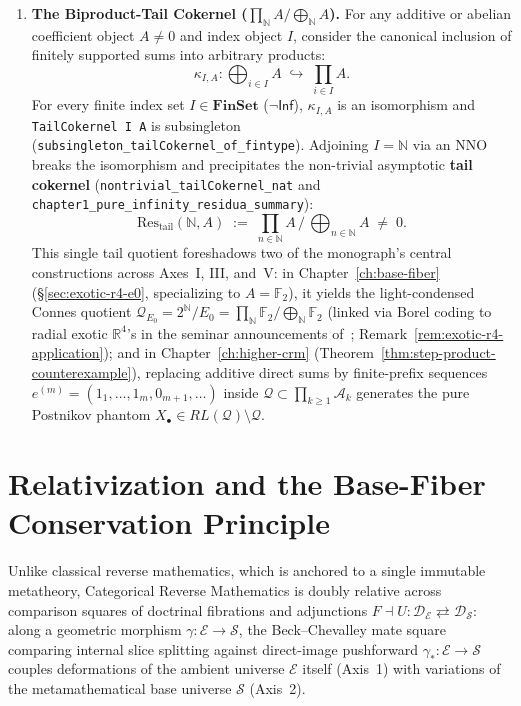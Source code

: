 \documentclass[10pt,twoside,openright]{book}
\theoremstyle{crmplain}
\theoremstyle{crmdef}
\theoremstyle{crmremark}
\begin{document}
\begin{enumerate}[label=\textbf{\arabic*.},leftmargin=1.8em]
  \item \textbf{The Biproduct-Tail Cokernel ($\prod_{\mathbb{N}} A / \bigoplus_{\mathbb{N}} A$).} For any additive or abelian coefficient object $A \neq 0$ and index object $I$, consider the canonical inclusion of finitely supported sums into arbitrary products:
  \[
    \kappa_{I, A} : \bigoplus_{i \in I} A \;\hookrightarrow\; \prod_{i \in I} A.
  \]
  For every finite index set $I \in \mathbf{FinSet}$ ($\neg\mathsf{Inf}$), $\kappa_{I, A}$ is an isomorphism and \texttt{TailCokernel I A} is subsingleton (\texttt{subsingleton\_\allowbreak tailCokernel\_\allowbreak of\_\allowbreak fintype}). Adjoining $I = \mathbb{N}$ via an $\mathrm{NNO}$ breaks the isomorphism and precipitates the non-trivial asymptotic \textbf{tail cokernel} (\texttt{nontrivial\_\allowbreak tailCokernel\_\allowbreak nat} and \texttt{chapter1\_\allowbreak pure\_\allowbreak infinity\_\allowbreak residua\_\allowbreak summary}):
  \[
    \mathrm{Res}_{\mathrm{tail}}(\mathbb{N}, A) \;:=\; \prod_{n \in \mathbb{N}} A \,\Big/\, \bigoplus_{n \in \mathbb{N}} A \;\neq\; 0.
  \]
  This single tail quotient foreshadows two of the monograph's central constructions across Axes~I, III, and~V: in Chapter~\ref{ch:base-fiber} (\S\ref{sec:exotic-r4-e0}, specializing to $A = \mathbb{F}_2$), it yields the light-condensed Connes quotient $\mathcal{Q}_{E_0} = 2^{\mathbb{N}}/E_0 = \prod_{\mathbb{N}} \mathbb{F}_2 / \bigoplus_{\mathbb{N}} \mathbb{F}_2$ (linked via Borel coding to radial exotic $\mathbb{R}^4$'s in the seminar announcements of~\cite{GompfPanagiotopoulos26}; Remark~\ref{rem:exotic-r4-application}); and in Chapter~\ref{ch:higher-crm} (Theorem~\ref{thm:step-product-counterexample}), replacing additive direct sums by finite-prefix sequences $e^{(m)} = (1_1, \dots, 1_m, 0_{m+1}, \dots)$ inside $\mathcal{Q} \subset \prod_{k \ge 1} \mathcal{A}_k$ generates the pure Postnikov phantom $X_\bullet \in RL(\mathcal{Q}) \setminus \mathcal{Q}$.

\end{enumerate}

\section{Relativization and the Base-Fiber Conservation Principle}\label{sec:base-fiber}

Unlike classical reverse mathematics, which is anchored to a single immutable metatheory, Categorical Reverse Mathematics is doubly relative across comparison squares of doctrinal fibrations and adjunctions $F \dashv U : \mathcal{D}_{\mathcal{E}} \rightleftarrows \mathcal{D}_{\mathcal{S}}$: along a geometric morphism $\gamma : \mathcal{E} \to \mathcal{S}$, the Beck--Chevalley mate square comparing internal slice splitting against direct-image pushforward $\gamma_* : \mathcal{E} \to \mathcal{S}$ couples deformations of the ambient universe $\mathcal{E}$ itself (Axis~1) with variations of the metamathematical base universe $\mathcal{S}$ (Axis~2).
\end{document}
